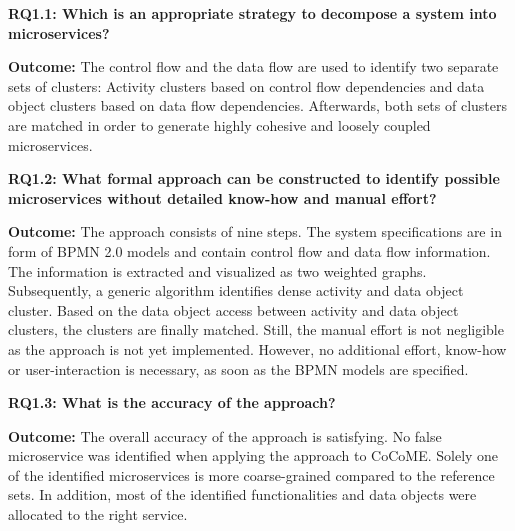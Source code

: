 \noindent
\textbf{RQ1.1: Which is an appropriate strategy to decompose a system into microservices? }

\vspace{0.3cm}
\noindent
\textbf{Outcome:} The control flow and the data flow are used to identify two separate sets of clusters: Activity clusters based on control flow dependencies and data object clusters based on data flow dependencies. Afterwards, both sets of clusters are matched in order to generate highly cohesive and loosely coupled microservices. 

\endgroup
\vspace{0.5cm}

\vspace{0.5cm}
\par
\begingroup

\noindent
\textbf{RQ1.2: What formal approach can be constructed to identify possible microservices without detailed know-how and manual effort? }

\vspace{0.3cm}
\noindent
\textbf{Outcome:} The approach consists of nine steps. The system specifications are in form of BPMN 2.0 models and contain control flow and data flow information. The information is extracted and visualized as two weighted graphs. Subsequently, a generic algorithm identifies dense activity and data object cluster. Based on the data object access between activity and data object clusters, the clusters are finally matched. Still, the manual effort is not negligible as the approach is not yet implemented. However, no additional effort, know-how or user-interaction is necessary, as soon as the BPMN models are specified. 



\endgroup
\vspace{0.5cm}

\vspace{0.5cm}
\par
\begingroup

\noindent
\textbf{RQ1.3: What is the accuracy of the approach? }

\vspace{0.3cm}
\noindent
\textbf{Outcome:} The overall accuracy of the approach is satisfying. No false microservice was identified when applying the approach to CoCoME. Solely one of the identified microservices is more coarse-grained compared to the reference sets. In addition, most of the identified functionalities and data objects were allocated to the right service. 

